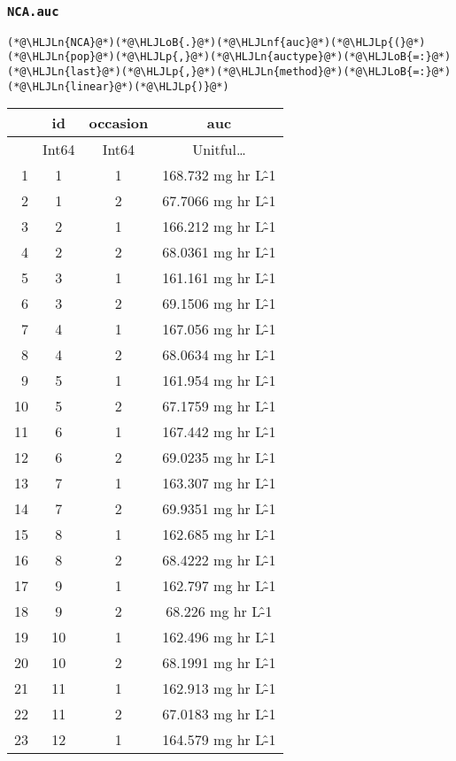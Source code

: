 \documentclass[12pt,a4paper]{article}
\newcommand{\HLJLn}[1]{#1}
\newcommand{\HLJLnf}[1]{\textcolor[RGB]{66,102,213}{#1}}
\newcommand{\HLJLoB}[1]{\textcolor[RGB]{102,102,102}{\textbf{#1}}}
\newcommand{\HLJLp}[1]{#1}
\begin{document}
\subsubsection{\texttt{NCA.auc}}

\begin{lstlisting}
(*@\HLJLn{NCA}@*)(*@\HLJLoB{.}@*)(*@\HLJLnf{auc}@*)(*@\HLJLp{(}@*)(*@\HLJLn{pop}@*)(*@\HLJLp{,}@*)(*@\HLJLn{auctype}@*)(*@\HLJLoB{=:}@*)(*@\HLJLn{last}@*)(*@\HLJLp{,}@*)(*@\HLJLn{method}@*)(*@\HLJLoB{=:}@*)(*@\HLJLn{linear}@*)(*@\HLJLp{)}@*)
\end{lstlisting}


\begin{tabular}{r|ccc}
	& id & occasion & auc\\
	\hline
	& Int64 & Int64 & Unitful…\\
	\hline
	1 & 1 & 1 & 168.732 mg hr L\^-1 \\
	2 & 1 & 2 & 67.7066 mg hr L\^-1 \\
	3 & 2 & 1 & 166.212 mg hr L\^-1 \\
	4 & 2 & 2 & 68.0361 mg hr L\^-1 \\
	5 & 3 & 1 & 161.161 mg hr L\^-1 \\
	6 & 3 & 2 & 69.1506 mg hr L\^-1 \\
	7 & 4 & 1 & 167.056 mg hr L\^-1 \\
	8 & 4 & 2 & 68.0634 mg hr L\^-1 \\
	9 & 5 & 1 & 161.954 mg hr L\^-1 \\
	10 & 5 & 2 & 67.1759 mg hr L\^-1 \\
	11 & 6 & 1 & 167.442 mg hr L\^-1 \\
	12 & 6 & 2 & 69.0235 mg hr L\^-1 \\
	13 & 7 & 1 & 163.307 mg hr L\^-1 \\
	14 & 7 & 2 & 69.9351 mg hr L\^-1 \\
	15 & 8 & 1 & 162.685 mg hr L\^-1 \\
	16 & 8 & 2 & 68.4222 mg hr L\^-1 \\
	17 & 9 & 1 & 162.797 mg hr L\^-1 \\
	18 & 9 & 2 & 68.226 mg hr L\^-1 \\
	19 & 10 & 1 & 162.496 mg hr L\^-1 \\
	20 & 10 & 2 & 68.1991 mg hr L\^-1 \\
	21 & 11 & 1 & 162.913 mg hr L\^-1 \\
	22 & 11 & 2 & 67.0183 mg hr L\^-1 \\
	23 & 12 & 1 & 164.579 mg hr L\^-1 \\

\end{tabular}
\end{document}
